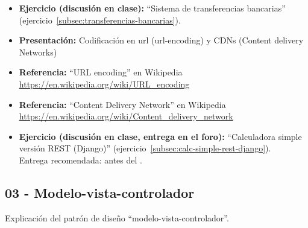 \documentclass[a4paper,12pt]{article}
\begin{document}
\begin{itemize}

\item \textbf{Ejercicio (discusión en clase):} ``Sistema de transferencias bancarias'' (ejercicio~\ref{subsec:transferencias-bancarias}).
\item \textbf{Presentación:} Codificación en url (url-encoding) y CDNs (Content delivery Networks)
\item \textbf{Referencia:} ``URL encoding'' en Wikipedia \\ \url{https://en.wikipedia.org/wiki/URL_encoding}
\item \textbf{Referencia:} ``Content Delivery Network'' en Wikipedia \\ \url{https://en.wikipedia.org/wiki/Content_delivery_network}
\item \textbf{Ejercicio (discusión en clase, entrega en el foro):} ``Calculadora simple versión REST (Django)'' (ejercicio~\ref{subsec:calc-simple-rest-django}). \\
  Entrega recomendada: antes del \martesH.
\end{itemize}




\subsection{03 - Modelo-vista-controlador}

Explicación del patrón de diseño ``modelo-vista-controlador''.
\end{document}
